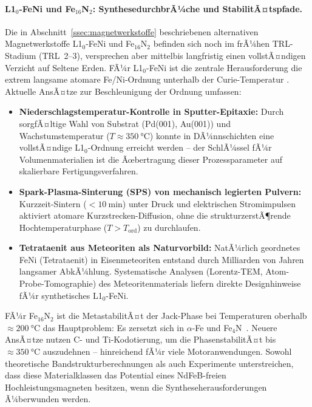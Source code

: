 ﻿\documentclass[12pt, a4paper]{report}
\theoremstyle{definition}
\theoremstyle{remark}
\begin{document}
\paragraph{L1${}_0$-FeNi und Fe${}_{16}$N${}_2$: SynthesedurchbrÃ¼che und
StabilitÃ¤tspfade.}
Die in Abschnitt~\ref{ssec:magnetwerkstoffe} beschriebenen alternativen
Magnetwerkstoffe L1$_0$-FeNi und Fe$_{16}$N$_2$ befinden sich noch im frÃ¼hen
TRL-Stadium (TRL~2--3), versprechen aber mittelbis langfristig einen vollstÃ¤ndigen
Verzicht auf Seltene Erden. FÃ¼r L1$_0$-FeNi ist die zentrale Herausforderung die
extrem langsame atomare Fe/Ni-Ordnung unterhalb der Curie-Temperatur
\cite{coey2010}. Aktuelle AnsÃ¤tze zur Beschleunigung der Ordnung umfassen:
\begin{itemize}
  \item \textbf{Niederschlagstemperatur-Kontrolle in Sputter-Epitaxie:}
        Durch sorgfÃ¤ltige Wahl von Substrat (Pd(001), Au(001)) und
        Wachstumstemperatur ($T \approx \SI{350}{\celsius}$) konnte in
        DÃ¼nnschichten eine vollstÃ¤ndige L1$_0$-Ordnung erreicht werden --
        der SchlÃ¼ssel fÃ¼r Volumenmaterialien ist die Ãœbertragung dieser
        Prozessparameter auf skalierbare Fertigungsverfahren.
  \item \textbf{Spark-Plasma-Sinterung (SPS) von mechanisch legierten Pulvern:}
        Kurzzeit-Sintern ($<\SI{10}{\minute}$) unter Druck und elektrischen
        Stromimpulsen aktiviert atomare Kurzstrecken-Diffusion, ohne die
        strukturzerstÃ¶rende Hochtemperaturphase ($T > T_{\text{ord}}$) zu
        durchlaufen.
  \item \textbf{Tetrataenit aus Meteoriten als Naturvorbild:}
        NatÃ¼rlich geordnetes FeNi (Tetrataenit) in Eisenmeteoriten entstand
        durch Milliarden von Jahren langsamer AbkÃ¼hlung. Systematische Analysen
        (Lorentz-TEM, Atom-Probe-Tomographie) des Meteoritenmaterials liefern
        direkte Designhinweise fÃ¼r synthetisches L1$_0$-FeNi.
\end{itemize}
FÃ¼r Fe$_{16}$N$_2$ ist die MetastabilitÃ¤t der Jack-Phase bei Temperaturen
oberhalb $\approx \SI{200}{\celsius}$ das Hauptproblem: Es zersetzt sich in
$\alpha$-Fe und Fe$_4$N~\cite{sugita1994}. Neuere AnsÃ¤tze nutzen C- und Ti-Kodotierung,
um die PhasenstabilitÃ¤t bis $\approx \SI{350}{\celsius}$ auszudehnen --
hinreichend fÃ¼r viele Motoranwendungen. Sowohl theoretische Bandstruktur\-berechnungen
\cite{herbst1991} als auch Experimente \cite{lewis2013, nakamura2018} unterstreichen,
dass diese Materialklassen das Potential eines NdFeB-freien Hochleistungsmagneten
besitzen, wenn die Syntheseherausforderungen Ã¼berwunden werden.
\end{document}

